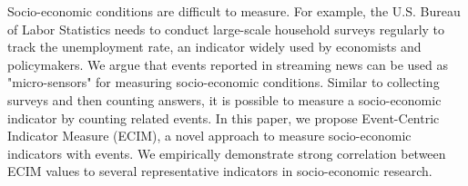 Socio-economic conditions are difficult to measure. For example, the U.S. Bureau of Labor Statistics needs to conduct large-scale household surveys regularly to track the unemployment rate, an indicator widely used by economists and policymakers. We argue that events reported in streaming news can be used as "micro-sensors" for measuring socio-economic conditions. Similar to collecting surveys and then counting answers, it is possible to measure a socio-economic indicator by counting related events. In this paper, we propose Event-Centric Indicator Measure (ECIM), a novel approach to measure socio-economic indicators with events. We empirically demonstrate strong correlation between ECIM values to several representative indicators in socio-economic research.
